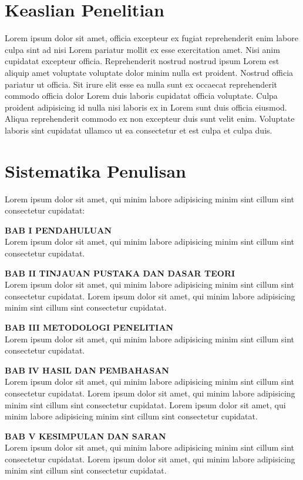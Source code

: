 \section{Keaslian Penelitian}
Lorem ipsum dolor sit amet, officia excepteur ex fugiat reprehenderit enim labore culpa sint ad nisi Lorem pariatur mollit ex esse exercitation amet. Nisi anim cupidatat excepteur officia. Reprehenderit nostrud nostrud ipsum Lorem est aliquip amet voluptate voluptate dolor minim nulla est proident. Nostrud officia pariatur ut officia. Sit irure elit esse ea nulla sunt ex occaecat reprehenderit commodo officia dolor Lorem duis laboris cupidatat officia voluptate. Culpa proident adipisicing id nulla nisi laboris ex in Lorem sunt duis officia eiusmod. Aliqua reprehenderit commodo ex non excepteur duis sunt velit enim. Voluptate laboris sint cupidatat ullamco ut ea consectetur et est culpa et culpa duis.

\section{Sistematika Penulisan}
Lorem ipsum dolor sit amet, qui minim labore adipisicing minim sint cillum sint consectetur cupidatat:
\hfil \break

\noindent
\textbf{BAB I PENDAHULUAN}\\
Lorem ipsum dolor sit amet, qui minim labore adipisicing minim sint cillum sint consectetur cupidatat.
\hfil \break

\noindent
\textbf{BAB II TINJAUAN PUSTAKA DAN DASAR TEORI}\\
Lorem ipsum dolor sit amet, qui minim labore adipisicing minim sint cillum sint consectetur cupidatat. Lorem ipsum dolor sit amet, qui minim labore adipisicing minim sint cillum sint consectetur cupidatat.
\hfil \break

\noindent
\textbf{BAB III METODOLOGI PENELITIAN}\\
Lorem ipsum dolor sit amet, qui minim labore adipisicing minim sint cillum sint consectetur cupidatat.
\hfil \break

\noindent
\textbf{BAB IV HASIL DAN PEMBAHASAN}\\
Lorem ipsum dolor sit amet, qui minim labore adipisicing minim sint cillum sint consectetur cupidatat. Lorem ipsum dolor sit amet, qui minim labore adipisicing minim sint cillum sint consectetur cupidatat. Lorem ipsum dolor sit amet, qui minim labore adipisicing minim sint cillum sint consectetur cupidatat.
\hfil \break

\noindent
\textbf{BAB V KESIMPULAN DAN SARAN}\\
Lorem ipsum dolor sit amet, qui minim labore adipisicing minim sint cillum sint consectetur cupidatat. Lorem ipsum dolor sit amet, qui minim labore adipisicing minim sint cillum sint consectetur cupidatat.
\hfil \break

